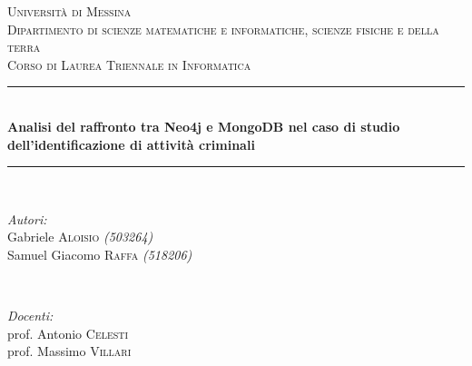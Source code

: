 \begin{titlepage}

\newcommand{\HRule}{\rule{\linewidth}{0.5mm}} %

\center %
 

\textsc{\LARGE Università di Messina}\\[1.5cm] %
\textsc{\Large Dipartimento di scienze matematiche e informatiche, scienze fisiche e della terra}\\[0.5cm] %
\textsc{\large Corso di Laurea Triennale in Informatica}\\[0.5cm] %


\HRule \\[0.4cm]
{ \huge \bfseries Analisi del raffronto tra Neo4j e MongoDB nel caso di studio dell’identificazione di attività criminali}\\[0.4cm] %
\HRule \\[1.5cm]
 

\begin{minipage}{0.4\textwidth}
\begin{flushleft} \large
\emph{Autori:}\\
Gabriele \textsc{Aloisio} \textit{(503264)} \\
Samuel Giacomo \textsc{Raffa} \textit{(518206)} \\
\end{flushleft}
\end{minipage}
~
\begin{minipage}{0.4\textwidth}
\begin{flushright} \large
\emph{Docenti:} \\
prof. Antonio \textsc{Celesti} \\
prof. Massimo \textsc{Villari} \\
\end{flushright}
\end{minipage}\\[2cm]


\end{titlepage}

